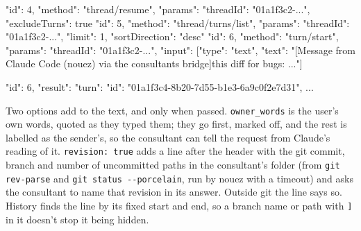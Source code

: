 \documentclass[10pt,a4paper]{article}
\newcommand{\code}[1]{\texttt{#1}}
\begin{document}
\begin{wire}
{"id": 4, "method": "thread/resume", "params": {"threadId": "01a1f3c2-...", "excludeTurns": true}}
{"id": 5, "method": "thread/turns/list", "params": {"threadId": "01a1f3c2-...", "limit": 1, "sortDirection": "desc"}}
{"id": 6, "method": "turn/start", "params": {"threadId": "01a1f3c2-...", "input": [{"type": "text",
  "text": "[Message from Claude Code (nouez) via the consultants bridge]\n\nReview this diff for bugs: ..."}]}}
\end{wire}
\begin{wire}
{"id": 6, "result": {"turn": {"id": "01a1f3c4-8b20-7d55-b1e3-6a9c0f2e7d31", ...}}}
\end{wire}
Two options add to the text, and only when passed. \code{owner\_words} is the user's own words,
quoted as they typed them; they go first, marked off, and the rest is labelled as the sender's, so
the consultant can tell the request from Claude's reading of it. \code{revision: true} adds a line
after the header with the git commit, branch and number of uncommitted paths in the consultant's
folder (from \code{git rev-parse} and \code{git status -{}-porcelain}, run by nouez with a timeout)
and asks the consultant to name that revision in its answer. Outside git the line says so.
History finds the line by its fixed start and end, so a branch name or path with \code{]} in it
doesn't stop it being hidden.
\end{document}
